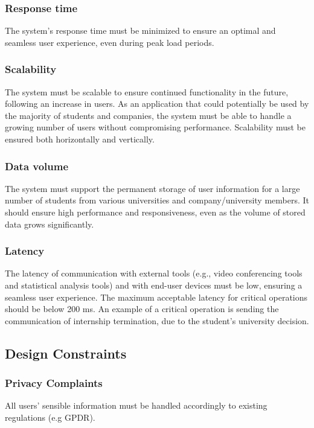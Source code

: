 \subsubsection{Response time}
The system's response time must be minimized to ensure an optimal and seamless user experience, even during peak load periods.
\subsubsection{Scalability}
The system must be scalable to ensure continued functionality in the future, following an increase in users. As an application that could potentially be used by the majority of students and companies, the system must be able to handle a growing number of users without compromising performance. Scalability must be ensured both horizontally and vertically.
\subsubsection{Data volume}
The system must support the permanent storage of user information for a large number of students from various universities and company/university members. It should ensure high performance and responsiveness, even as the volume of stored data grows significantly.
\subsubsection{Latency}
The latency of communication with external tools (e.g., video conferencing tools and statistical analysis tools) and with end-user devices must be low, ensuring a seamless user experience. The maximum acceptable latency for critical operations should be below 200 ms. An example of a critical operation is sending the communication of internship termination, due to the student's university decision.

\subsection{Design Constraints}

\subsubsection{Privacy Complaints}
All users' sensible information must be handled accordingly to existing regulations (e.g GPDR).


